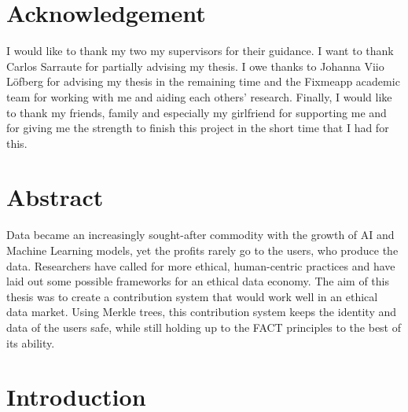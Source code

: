 \documentclass[a4paper,11pt]{report} %
\theoremstyle{change}
\theoremstyle{theoremstyle}
\begin{document}

\chapter*{Acknowledgement}
I would like to thank my two my supervisors for their guidance. I want to thank Carlos Sarraute for partially advising my thesis. I owe thanks to Johanna Viio Löfberg for advising my thesis in the remaining time and the Fixmeapp academic team for working with me and aiding each others' research.
Finally, I would like to thank my friends, family and especially my girlfriend for supporting me and for giving me the strength to finish this project in the short time that I had for this.
\newpage

\chapter*{Abstract}
Data became an increasingly sought-after commodity with the growth of AI and Machine Learning models, yet the profits rarely go to the users, who produce the data. Researchers have called for more ethical, human-centric practices and have laid out some possible frameworks for an ethical data economy. The aim of this thesis was to create a contribution system that would work well in an ethical data market. Using Merkle trees, this contribution system keeps the identity and data of the users safe, while still holding up to the FACT principles to the best of its ability.

\tableofcontents

\chapter{Introduction}

\end{document}
